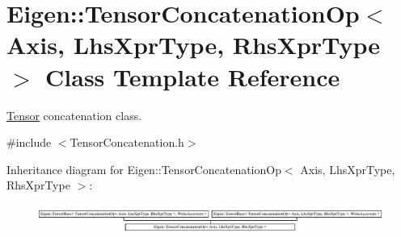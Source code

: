 \hypertarget{class_eigen_1_1_tensor_concatenation_op}{}\section{Eigen\+:\+:Tensor\+Concatenation\+Op$<$ Axis, Lhs\+Xpr\+Type, Rhs\+Xpr\+Type $>$ Class Template Reference}
\label{class_eigen_1_1_tensor_concatenation_op}


\hyperlink{class_eigen_1_1_tensor}{Tensor} concatenation class.  




{\ttfamily \#include $<$Tensor\+Concatenation.\+h$>$}

Inheritance diagram for Eigen\+:\+:Tensor\+Concatenation\+Op$<$ Axis, Lhs\+Xpr\+Type, Rhs\+Xpr\+Type $>$\+:\begin{figure}[H]
\begin{center}
\leavevmode
\includegraphics[height=0.950764cm]{class_eigen_1_1_tensor_concatenation_op}
\end{center}
\end{figure}
